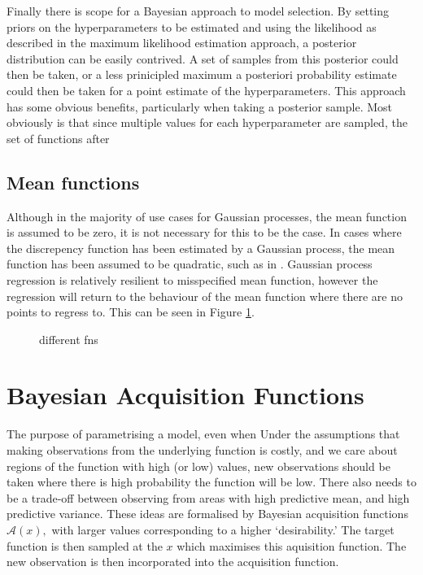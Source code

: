 Finally there is scope for a Bayesian approach to model selection. By setting
priors on the hyperparameters to be estimated and using the likelihood as described
in the maximum likelihood estimation approach, a posterior distribution can be
easily contrived. A set of samples from this posterior could then be taken, or
a less prinicipled maximum a posteriori probability
estimate could then be taken for a point estimate of the hyperparameters. This
approach has some obvious benefits, particularly when taking a posterior
sample. Most obviously is that since multiple values for each hyperparameter are
sampled, the set of functions after

\subsection*{Mean functions}

Although in the majority of use cases for Gaussian processes, the mean function
is assumed to be zero, it is not necessary for this to be the case. In cases
where the discrepency function has been estimated by a Gaussian process, 
the mean function has been assumed to be quadratic, such as in 
\parencite{gutmann_bayesian_2016}. Gaussian process regression is relatively
resilient to misspecified mean function, however the regression will return to
the behaviour of the mean function where there are no points to regress to. 
This can be seen in Figure \ref{fig:means}.

\begin{figure}[htbp]
    \label{fig:means}
    \caption{different fns}
\end{figure}

\section{Bayesian Acquisition Functions}

The purpose of parametrising a model, even when
Under the assumptions that making observations from the underlying function is
costly, and we care about regions of the function with high (or low)
values, new observations should be taken where there is high probability the
function will be low. There also needs to be a trade-off between observing from
areas with high predictive mean, and high predictive variance. These ideas are
formalised by Bayesian acquisition functions $\mathcal{A}(x),$ with larger
values corresponding to a higher `desirability.' The target function is then
sampled at the $x$ which maximises this aquisition function. The new
observation is then incorporated into the acquisition function.


